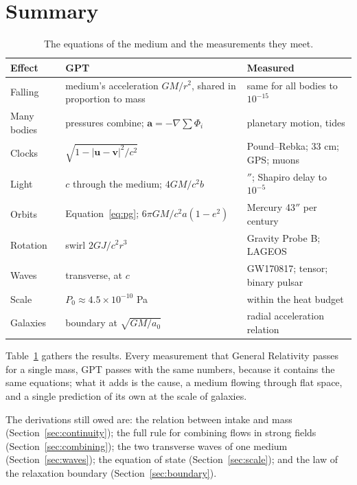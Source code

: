 \documentclass[11pt,a4paper]{article}
\begin{document}
\section{Summary}
\label{sec:summary}

\begin{table}[tb]
\centering
\small
\renewcommand{\arraystretch}{1.22}
\begin{tabular}{@{}>{\raggedright\arraybackslash}p{}>{\raggedright\arraybackslash}p{}>{\raggedright\arraybackslash}p{}@{}}
\toprule
\textbf{Effect} & \textbf{GPT} & \textbf{Measured} \\
\midrule
Falling & medium's acceleration $GM/r^2$, shared in proportion to mass & same for all bodies to $10^{-15}$ \\
Many bodies & pressures combine; $\mathbf{a} = -\nabla\sum\Phi_i$ & planetary motion, tides \\
Clocks & $\sqrt{1-|\mathbf{u}-\mathbf{v}|^2/c^2}$ & Pound--Rebka; 33 cm; GPS; muons \\
Light & $c$ through the medium; $4GM/c^2b$ & 1.75$''$; Shapiro delay to $10^{-5}$ \\
Orbits & Equation~\eqref{eq:pg}; $6\pi GM/c^2a(1-e^2)$ & Mercury 43$''$ per century \\
Rotation & swirl $2GJ/c^2r^3$ & Gravity Probe B; LAGEOS \\
Waves & transverse, at $c$ & GW170817; tensor; binary pulsar \\
Scale & $P_0 \approx 4.5\times10^{-10}$ Pa & within the heat budget \\
Galaxies & boundary at $\sqrt{GM/a_0}$ & radial acceleration relation \\
\bottomrule
\end{tabular}
\caption{The equations of the medium and the measurements they meet.}
\label{tab:summary}
\end{table}

Table~\ref{tab:summary} gathers the results. Every measurement that General Relativity passes for a single mass, GPT passes with the same numbers, because it contains the same equations; what it adds is the cause, a medium flowing through flat space, and a single prediction of its own at the scale of galaxies.

The derivations still owed are: the relation between intake and mass (Section~\ref{sec:continuity}); the full rule for combining flows in strong fields (Section~\ref{sec:combining}); the two transverse waves of one medium (Section~\ref{sec:waves}); the equation of state (Section~\ref{sec:scale}); and the law of the relaxation boundary (Section~\ref{sec:boundary}).
\end{document}
